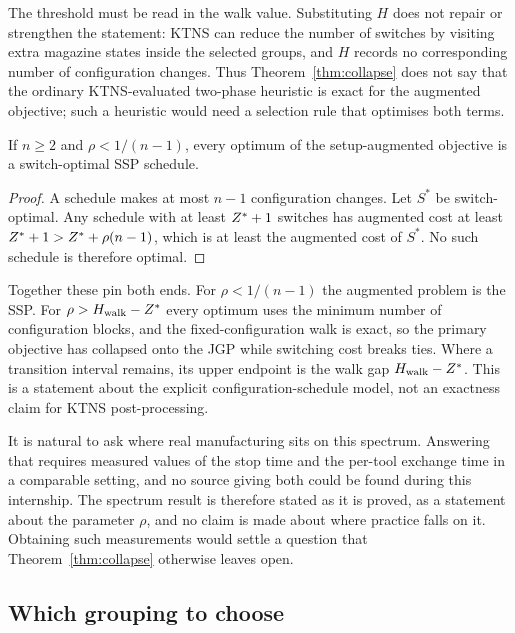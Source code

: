The threshold must be read in the walk value. Substituting $H$ does not repair or
strengthen the statement: KTNS can reduce the number of switches by visiting extra
magazine states inside the selected groups, and $H$ records no corresponding number of
configuration changes. Thus Theorem~\ref{thm:collapse} does not say that the ordinary
KTNS-evaluated two-phase heuristic is exact for the augmented objective; such a
heuristic would need a selection rule that optimises both terms.

\begin{lemma}\label{lem:lowrho}
If $n\ge2$ and $\rho<1/(n-1)$, every optimum of the setup-augmented objective is a
switch-optimal SSP schedule.
\end{lemma}

\begin{proof}
A schedule makes at most $n-1$ configuration changes. Let $S^{*}$ be switch-optimal.
Any schedule with at least $Z^{\ast}+1$ switches has augmented cost at least
$Z^{\ast}+1>Z^{\ast}+\rho(n-1)$, which is at least the augmented cost of $S^{*}$. No such
schedule is therefore optimal.
\end{proof}

Together these pin both ends. For $\rho<1/(n-1)$ the augmented problem is the SSP.
For $\rho>H_{\mathrm{walk}}-Z^{\ast}$ every optimum uses the minimum number of configuration blocks,
and the fixed-configuration walk is exact, so the primary objective has collapsed onto
the JGP while switching cost breaks ties. Where a transition interval remains, its
upper endpoint is the walk gap $H_{\mathrm{walk}}-Z^{\ast}$. This is a statement about the explicit
configuration-schedule model, not an exactness claim for KTNS post-processing.

\begin{remark}\label{rem:rho}
It is natural to ask where real manufacturing sits on this spectrum. Answering that
requires measured values of the stop time and the per-tool exchange time in a
comparable setting, and no source giving both could be found during this internship.
The spectrum result is therefore stated as it is proved, as a statement about the
parameter $\rho$, and no claim is made about where practice falls on it. Obtaining
such measurements would settle a question that Theorem~\ref{thm:collapse} otherwise
leaves open.
\end{remark}

\subsection{Which grouping to choose}\label{ssec:grouping-sel}

